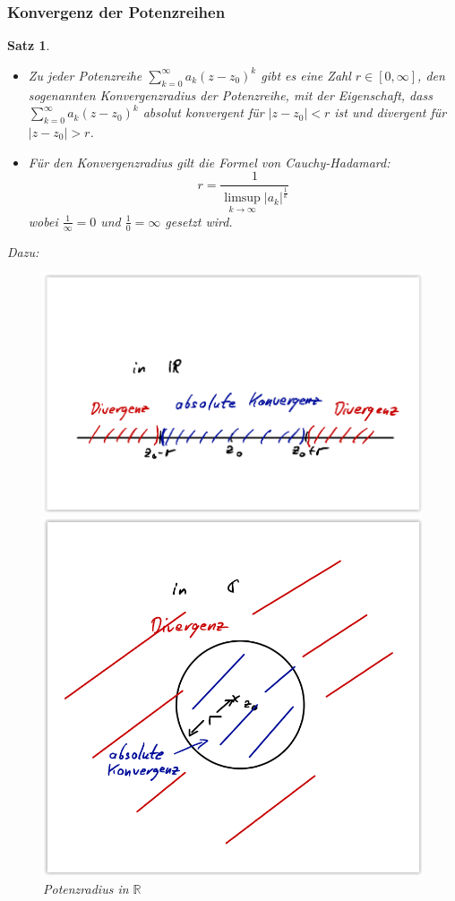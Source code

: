 \documentclass[12pt,a4paper]{article}%
\newtheorem{satz}{Satz}[section]
\numberwithin{equation}{section}
\newcommand{\R}{\mathbb{R}} %
\numberwithin{equation}{subsection}
\begin{document}
	  \subsubsection{Konvergenz der Potenzreihen}
	  \begin{satz}$\;$ \newline \vspace{-0.5cm}
	    \begin{itemize}
	      \item[a) ] Zu jeder Potenzreihe $\sum\limits_{k = 0}^\infty a_k(z-z_0)^k$ gibt es eine Zahl $r \in [0,\infty]$, den sogenannten Konvergenzradius der Potenzreihe, mit der Eigenschaft, dass $\sum\limits_{k = 0}^\infty a_k(z-z_0)^k$ absolut konvergent für $|z-z_0| < r$ ist und divergent für $|z-z_0| > r$.
	      \item[b) ] Für den Konvergenzradius gilt die Formel von Cauchy-Hadamard:
	      \begin{equation}
	        r = \frac{1}{\limsup\limits_{k \rightarrow \infty} |a_k|^\frac{1}{k}}
	      \end{equation}
	      wobei $\frac{1}{\infty}=0$ und $\frac{1}{0} = \infty$ gesetzt wird.
	    \end{itemize}
	    Dazu:
	    \begin{figure}[H] 
				\centering
				\begin{minipage}{.5\textwidth}
				  \centering
				  \includegraphics[width=0.8\linewidth]{reihen_potenzreihen_r.png}
				  \caption{Potenzradius in $\R$ \protect\cite{HM12}}
				  \label{fig:reihe_potenzradius_r}
				\end{minipage}%
				\begin{minipage}{.5\textwidth}
				  \centering
				  \includegraphics[width=0.55\linewidth]{reihen_potenzreihen_c.png}

\end{minipage}
\end{figure}
\end{satz}
\end{document}
